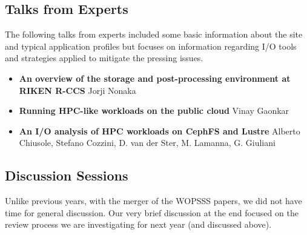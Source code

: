 \documentclass{llncs}
\begin{document}
\subsection{Talks from Experts}

The following talks from experts included some basic information about the site and typical application profiles but focuses on information regarding I/O tools and strategies applied to mitigate the pressing issues.

\begin{itemize}

\item \textbf{An overview of the storage and post-processing environment at RIKEN R-CCS} Jorji Nonaka\\

\item \textbf{Running HPC-like workloads on the public cloud} Vinay Gaonkar\\

\item \textbf{An I/O analysis of HPC workloads on CephFS and Lustre} Alberto Chiusole, Stefano Cozzini, D. van der Ster, M. Lamanna, G. Giuliani\\

\end{itemize}

\subsection{Discussion Sessions}

Unlike previous years, with the merger of the WOPSSS papers, we did not have time for general discussion. Our very brief discussion at the end focused on the review process we are investigating for next year (and discussed above).
\end{document}
